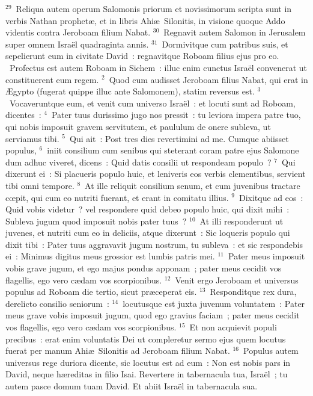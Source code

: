 ${}^{29}$~Reliqua autem operum Salomonis priorum et novissimorum scripta sunt in verbis Nathan prophet\ae , et in libris Ahi\ae\ Silonitis, in visione quoque Addo videntis contra Jeroboam filium Nabat.
${}^{30}$~Regnavit autem Salomon in Jerusalem super omnem Isra\"el quadraginta annis.
${}^{31}$~Dormivitque cum patribus suis, et sepelierunt eum in civitate David~: regnavitque Roboam filius ejus pro eo.
~Profectus est autem Roboam in Sichem~: illuc enim cunctus Isra\"el convenerat ut constituerent eum regem.
${}^{2}$~Quod cum audisset Jeroboam filius Nabat, qui erat in \AE gypto (fugerat quippe illuc ante Salomonem), statim reversus est.
${}^{3}$~Vocaveruntque eum, et venit cum universo Isra\"el~: et locuti sunt ad Roboam, dicentes~:
${}^{4}$~Pater tuus durissimo jugo nos pressit~: tu leviora impera patre tuo, qui nobis imposuit gravem servitutem, et paululum de onere subleva, ut serviamus tibi.
${}^{5}$~Qui ait~: Post tres dies revertimini ad me. Cumque abiisset populus,
${}^{6}$~iniit consilium cum senibus qui steterant coram patre ejus Salomone dum adhuc viveret, dicens~: Quid datis consilii ut respondeam populo~?
${}^{7}$~Qui dixerunt ei~: Si placueris populo huic, et leniveris eos verbis clementibus, servient tibi omni tempore.
${}^{8}$~At ille reliquit consilium senum, et cum juvenibus tractare cœpit, qui cum eo nutriti fuerant, et erant in comitatu illius.
${}^{9}$~Dixitque ad eos~: Quid vobis videtur~? vel respondere quid debeo populo huic, qui dixit mihi~: Subleva jugum quod imposuit nobis pater tuus~?
${}^{10}$~At illi responderunt ut juvenes, et nutriti cum eo in deliciis, atque dixerunt~: Sic loqueris populo qui dixit tibi~: Pater tuus aggravavit jugum nostrum, tu subleva~: et sic respondebis ei~: Minimus digitus meus grossior est lumbis patris mei.
${}^{11}$~Pater meus imposuit vobis grave jugum, et ego majus pondus apponam~; pater meus cecidit vos flagellis, ego vero c\ae dam vos scorpionibus.
${}^{12}$~Venit ergo Jeroboam et universus populus ad Roboam die tertio, sicut pr\ae ceperat eis.
${}^{13}$~Responditque rex dura, derelicto consilio seniorum~:
${}^{14}$~locutusque est juxta juvenum voluntatem~: Pater meus grave vobis imposuit jugum, quod ego gravius faciam~; pater meus cecidit vos flagellis, ego vero c\ae dam vos scorpionibus.
${}^{15}$~Et non acquievit populi precibus~: erat enim voluntatis Dei ut compleretur sermo ejus quem locutus fuerat per manum Ahi\ae\ Silonitis ad Jeroboam filium Nabat.
${}^{16}$~Populus autem universus rege duriora dicente, sic locutus est ad eum~: Non est nobis pars in David, neque h\ae reditas in filio Isai. Revertere in tabernacula tua, Isra\"el~; tu autem pasce domum tuam David. Et abiit Isra\"el in tabernacula sua.
